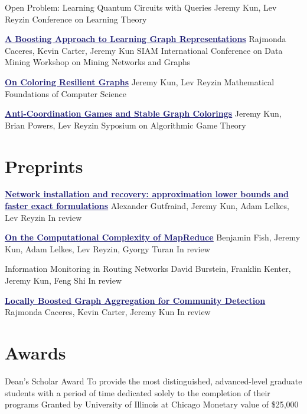 \documentclass[11pt]{moderncv}
\begin{document}
         {Open Problem: Learning Quantum Circuits with Queries}
      {Jeremy Kun, Lev Reyzin}
      {Conference on Learning Theory}
      {}
      {}

         {\href{http://arxiv.org/abs/1401.3258}{\textcolor{MidnightBlue}{\underline{\textbf{A Boosting Approach to Learning Graph Representations}}}}}
      {Rajmonda Caceres, Kevin Carter, Jeremy Kun}
      {SIAM International Conference on Data Mining Workshop on Mining Networks and Graphs}
      {}
      {}

         {\href{http://arxiv.org/abs/1402.4376}{\textcolor{MidnightBlue}{\underline{\textbf{On Coloring Resilient Graphs}}}}}
      {Jeremy Kun, Lev Reyzin}
      {Mathematical Foundations of Computer Science}
      {}
      {}

         {\href{http://arxiv.org/abs/1308.3258}{\textcolor{MidnightBlue}{\underline{\textbf{Anti-Coordination Games and Stable Graph Colorings}}}}}
      {Jeremy Kun, Brian Powers, Lev Reyzin}
      {Syposium on Algorithmic Game Theory}
      {}
      {}


   \section{Preprints}
         \cventry{}
         {\href{http://arxiv.org/abs/1411.3640}{\textcolor{MidnightBlue}{\underline{\textbf{Network installation and recovery: approximation lower bounds and faster exact formulations}}}}}
      {}
      {Alexander Gutfraind, Jeremy Kun, Adam Lelkes, Lev Reyzin}
      {}
      {In review}

      \cventry{}
         {\href{http://arxiv.org/abs/1410.0245}{\textcolor{MidnightBlue}{\underline{\textbf{On the Computational Complexity of MapReduce}}}}}
      {}
      {Benjamin Fish, Jeremy Kun, Adam Lelkes, Lev Reyzin, Gyorgy Turan}
      {}
      {In review}

      \cventry{}
         {Information Monitoring in Routing Networks}
      {}
      {David Burstein, Franklin Kenter, Jeremy Kun, Feng Shi}
      {}
      {In review}

      \cventry{}
         {\href{http://arxiv.org/abs/1405.3210}{\textcolor{MidnightBlue}{\underline{\textbf{Locally Boosted Graph Aggregation for Community Detection}}}}}
      {}
      {Rajmonda Caceres, Kevin Carter, Jeremy Kun}
      {}
      {In review}


   \section{Awards}
         {Dean's Scholar Award}
      {To provide the most distinguished, advanced-level graduate students with a period of time dedicated solely to the completion of their programs}
      {Granted by University of Illinois at Chicago}
      {}
      {Monetary value of \$25,000}
\end{document}
